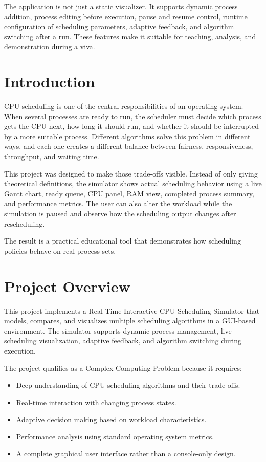 \documentclass[12pt]{article}
\begin{document}
The application is not just a static visualizer. It supports dynamic process addition, process editing before execution, pause and resume control, runtime configuration of scheduling parameters, adaptive feedback, and algorithm switching after a run. These features make it suitable for teaching, analysis, and demonstration during a viva.

\section*{Introduction}
CPU scheduling is one of the central responsibilities of an operating system. When several processes are ready to run, the scheduler must decide which process gets the CPU next, how long it should run, and whether it should be interrupted by a more suitable process. Different algorithms solve this problem in different ways, and each one creates a different balance between fairness, responsiveness, throughput, and waiting time.

This project was designed to make those trade-offs visible. Instead of only giving theoretical definitions, the simulator shows actual scheduling behavior using a live Gantt chart, ready queue, CPU panel, RAM view, completed process summary, and performance metrics. The user can also alter the workload while the simulation is paused and observe how the scheduling output changes after rescheduling.

The result is a practical educational tool that demonstrates how scheduling policies behave on real process sets.

\tableofcontents
\newpage

\section{Project Overview}
This project implements a Real-Time Interactive CPU Scheduling Simulator that models, compares, and visualizes multiple scheduling algorithms in a GUI-based environment. The simulator supports dynamic process management, live scheduling visualization, adaptive feedback, and algorithm switching during execution.

The project qualifies as a Complex Computing Problem because it requires:
\begin{itemize}[leftmargin=*]
    \item Deep understanding of CPU scheduling algorithms and their trade-offs.
    \item Real-time interaction with changing process states.
    \item Adaptive decision making based on workload characteristics.
    \item Performance analysis using standard operating system metrics.
    \item A complete graphical user interface rather than a console-only design.
\end{itemize}
\end{document}
